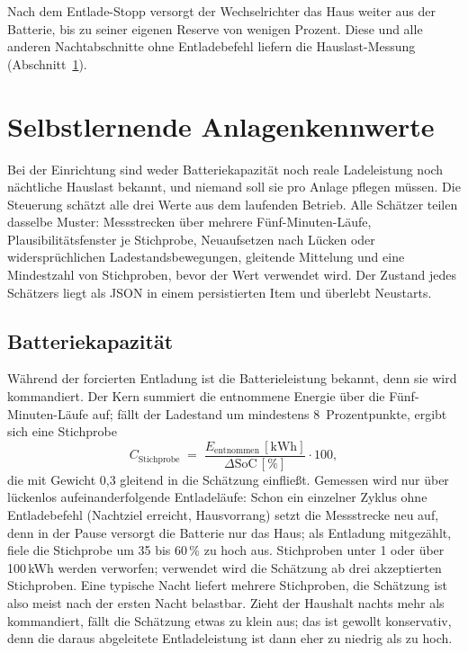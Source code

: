\documentclass[11pt,a4paper]{article}
\begin{document}
Nach dem Entlade-Stopp versorgt der Wechselrichter das Haus weiter aus der
Batterie, bis zu seiner eigenen Reserve von wenigen Prozent. Diese und alle
anderen Nachtabschnitte ohne Entladebefehl liefern die Hauslast-Messung
(Abschnitt~\ref{sec:lernen}).

\section{Selbstlernende Anlagenkennwerte}\label{sec:lernen}

Bei der Einrichtung sind weder Batteriekapazität noch reale Ladeleistung
noch nächtliche Hauslast bekannt, und niemand soll sie pro Anlage pflegen
müssen. Die Steuerung schätzt alle drei Werte aus dem laufenden Betrieb.
Alle Schätzer teilen dasselbe Muster: Messstrecken über mehrere
Fünf-Minuten-Läufe, Plausibilitätsfenster je Stichprobe, Neuaufsetzen nach
Lücken oder widersprüchlichen Ladestandsbewegungen, gleitende Mittelung und
eine Mindestzahl von Stichproben, bevor der Wert verwendet wird. Der
Zustand jedes Schätzers liegt als JSON in einem persistierten Item und
überlebt Neustarts.

\subsection{Batteriekapazität}

Während der forcierten Entladung ist die Batterieleistung bekannt, denn sie
wird kommandiert. Der Kern summiert die entnommene Energie über die
Fünf-Minuten-Läufe auf; fällt der Ladestand um mindestens 8~Prozentpunkte,
ergibt sich eine Stichprobe
\begin{equation}
  C_{\text{Stichprobe}} \;=\;
  \frac{E_{\text{entnommen}}\,[\text{kWh}]}{\Delta\text{SoC}\,[\%]}\cdot 100,
\end{equation}
die mit Gewicht 0,3 gleitend in die Schätzung einfließt. Gemessen wird nur
über lückenlos aufeinanderfolgende Entladeläufe: Schon ein einzelner Zyklus
ohne Entladebefehl (Nachtziel erreicht, Hausvorrang) setzt die Messstrecke
neu auf, denn in der Pause versorgt die Batterie nur das Haus; als
Entladung mitgezählt, fiele die Stichprobe um 35 bis 60\,\% zu hoch aus.
Stichproben unter
1 oder über 100\,kWh werden verworfen; verwendet wird die Schätzung ab drei
akzeptierten Stichproben. Eine typische Nacht liefert mehrere Stichproben,
die Schätzung ist also meist nach der ersten Nacht belastbar. Zieht der
Haushalt nachts mehr als kommandiert, fällt die Schätzung etwas zu klein
aus; das ist gewollt konservativ, denn die daraus abgeleitete
Entladeleistung ist dann eher zu niedrig als zu hoch.
\end{document}
